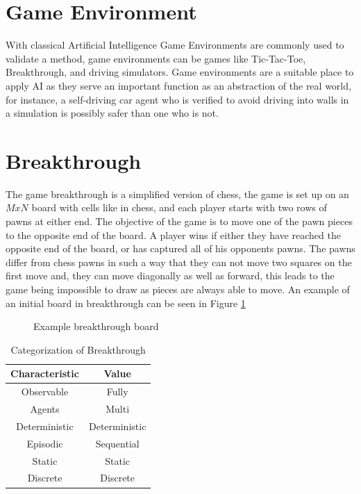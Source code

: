 \section{Game Environment}

With classical Artificial Intelligence Game Environments are commonly used to validate a method, 
game environments can be games like Tic-Tac-Toe, Breakthrough, and driving simulators. Game environments 
are a suitable place to apply AI as they serve an important function as an abstraction of the real 
world, for instance, a self-driving car agent who is verified to avoid driving into walls in a 
simulation is possibly safer than one who is not.

\section{Breakthrough}


The game breakthrough is a simplified version of chess, the game is set up on an $MxN$ board with 
cells like in chess, and each player starts with two rows of pawns at either end. The objective of the 
game is to move one of the pawn pieces to the opposite end of the board. A player wins if 
either they have reached the opposite end of the board, or has captured all of his opponents pawns.
The pawns differ from chess pawns in such a way that they can not move two squares on the first move and,
they can move diagonally as well as forward, this leads to the game being impossible to draw as 
pieces are always able to move. An example of an initial board in breakthrough can be seen in Figure \ref{fig:initbtboard}

\begin{figure}[]
  \centering

  
  \caption{Example breakthrough board}
  \label{fig:initbtboard}
\end{figure}


\begin{table}[h]
  \centering
  \begin{tabular}{|c|c|}\hline
    \textbf{Characteristic} & \textbf{Value}\\\hline
    Observable & Fully \\
    Agents & Multi \\
    Deterministic & Deterministic\\
    Episodic & Sequential \\
    Static & Static \\
    Discrete & Discrete \\\hline
  \end{tabular}
  \caption{Categorization of Breakthrough}
  \label{tab:breakthrough_cat}
\end{table}

